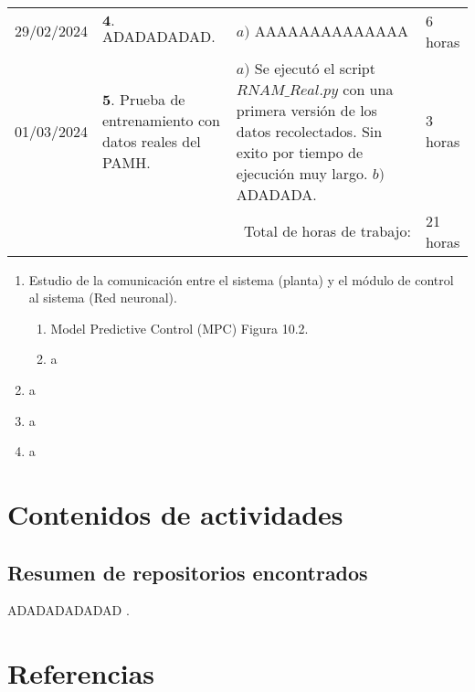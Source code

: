 \documentclass[12pt]{article}
\begin{document}
\hfill\\
\begin{minipage}[h]{\textwidth}
	\centering
	\begin{tabularx}{\textwidth}{|p{2cm}|X|X|p{2cm}|} 
		\hline		
		
	 	29/02/2024 & 
	 	$\mathbf{4}.$ ADADADADAD. & 
	 	$a)$ AAAAAAAAAAAAAA \newline  & 
	 	6 horas \\
	 	01/03/2024 & 
	 	$\mathbf{5}.$ Prueba de entrenamiento con datos reales del PAMH. & 
	 	$a)$ Se ejecutó el script $RNAM\_Real.py$ con una primera versión de los datos recolectados. Sin exito por tiempo de ejecución muy largo. \newline 
	 	$b)$ ADADADA. \newline & 
	 	3 horas \\
	 	\hline
		\multicolumn{3}{|r|}{Total de horas de trabajo:} & 21 horas \\ 
	 	\hline                 
	\end{tabularx}
\end{minipage}


\begin{enumerate}
	\item Estudio de la comunicación entre el sistema (planta) y el módulo de control al sistema (Red neuronal).
	\begin{enumerate}
		\item Model Predictive Control (MPC) \cite{DataScience} Figura 10.2.
		\item a
	\end{enumerate}
	\item a
	\item a
	\item a
\end{enumerate}


\newpage

\section*{Contenidos de actividades}

\subsection*{Resumen de repositorios encontrados}

ADADADADADAD \cite{DataScience}.






\newpage

\section*{Referencias}
\renewcommand\refname{}


\end{document}

